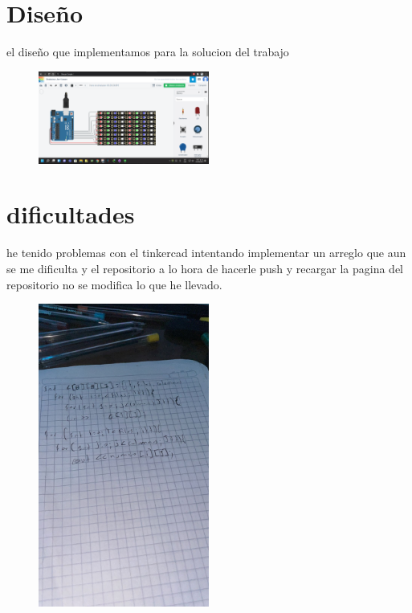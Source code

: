 \documentclass{article}
\begin{document}
\section{Diseño}
el diseño que implementamos para la solucion del trabajo
\begin{figure}
\includegraphics[width=0.5\textwidth]{image1.png}
\end{figure}
\section{dificultades}
he tenido problemas con el tinkercad intentando implementar un arreglo que aun se me dificulta y el repositorio a lo hora de hacerle push y recargar la pagina del repositorio no se modifica lo que he llevado.
\begin{figure}
\centering
\includegraphics[width=0.5\textwidth]{1.jpeg}
\end{figure}
\end{document}
